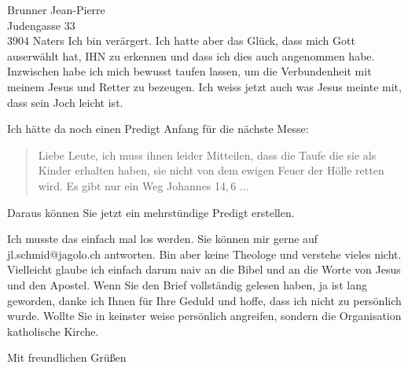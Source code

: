 \documentclass[
    12pt,
    a4paper,
    letter,
    parskip=yes,
    ]{scrlttr2}
\begin{document}
\begin{letter}{
Brunner Jean-Pierre\\
Judengasse 33\\
3904 Naters}
Ich bin verärgert. Ich hatte aber das Glück, dass mich Gott auserwählt hat, IHN zu erkennen und dass ich dies auch angenommen habe. Inzwischen habe ich mich bewusst taufen lassen, um die Verbundenheit mit meinem Jesus und Retter zu bezeugen. Ich weiss jetzt auch was Jesus meinte mit, dass sein Joch leicht ist. 


Ich hätte da noch einen Predigt Anfang für die nächste Messe:
\begin{quote}
    Liebe Leute, ich muss ihnen leider Mitteilen, dass die Taufe die sie als Kinder erhalten haben, sie nicht von dem ewigen Feuer der Hölle retten wird. Es gibt nur ein Weg Johannes 14,\,6
    ...
\end{quote}
Daraus können Sie jetzt ein mehrstündige Predigt erstellen.


Ich musste das einfach mal los werden. Sie können mir gerne auf jl.schmid@jagolo.ch antworten. Bin aber keine Theologe und verstehe vieles nicht. Vielleicht glaube ich einfach darum naiv an die Bibel und an die Worte von Jesus und den Apostel. 
Wenn Sie den Brief vollständig gelesen haben, ja ist lang geworden, danke ich Ihnen für Ihre Geduld und hoffe, dass ich nicht zu persönlich wurde. Wollte Sie in keinster weise persönlich angreifen, sondern die Organisation katholische Kirche.

\closing{Mit freundlichen Grüßen}
\end{letter}
\end{document}
